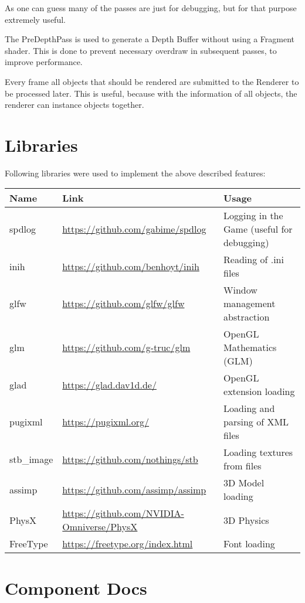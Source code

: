 \documentclass{article}
\begin{document}
    As one can guess many of the passes are just for debugging, but for that purpose extremely useful.

    The PreDepthPass is used to generate a Depth Buffer without using a Fragment shader. This is done to prevent necessary overdraw in subsequent passes, to improve performance.

    Every frame all objects that should be rendered are submitted to the Renderer to be processed later. This is useful, because with the information of all objects, the renderer can instance objects together.

    \section{Libraries}

    Following libraries were used to implement the above described features:

    \begin{tabular}{|l|l|l|}
        \hline
        Name & Link & Usage \\ \hline
        spdlog & \url{https://github.com/gabime/spdlog} & Logging in the Game (useful for debugging) \\ \hline
        inih & \url{https://github.com/benhoyt/inih} & Reading of .ini files \\ \hline
        glfw & \url{https://github.com/glfw/glfw} & Window management abstraction \\ \hline
        glm & \url{https://github.com/g-truc/glm} & OpenGL Mathematics (GLM) \\ \hline
        glad & \url{https://glad.dav1d.de/} & OpenGL extension loading \\ \hline
        pugixml & \url{https://pugixml.org/} & Loading and parsing of XML files \\ \hline
        stb\_image & \url{https://github.com/nothings/stb} & Loading textures from files \\ \hline
        assimp & \url{https://github.com/assimp/assimp} & 3D Model loading \\ \hline
        PhysX & \url{https://github.com/NVIDIA-Omniverse/PhysX} & 3D Physics \\ \hline
        FreeType & \url{https://freetype.org/index.html} & Font loading \\ \hline
    \end{tabular}

    \section{Component Docs}
    \label{sec:compDocs}
\end{document}
